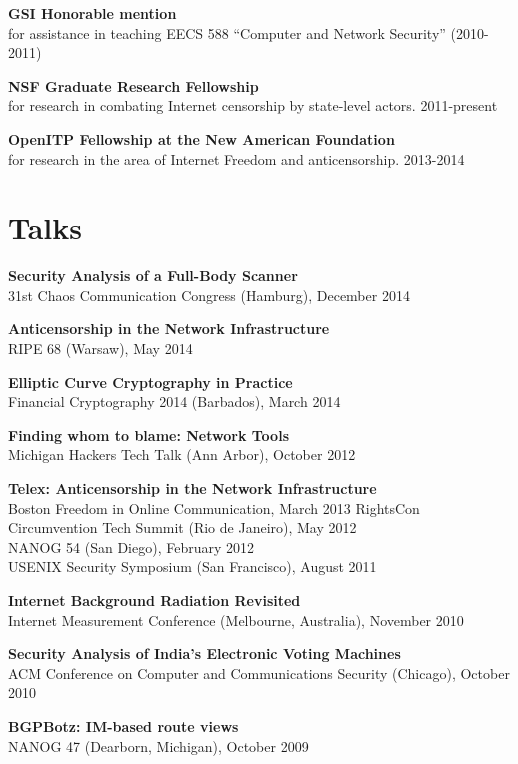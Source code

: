 \documentclass{res}
\begin{document}
\begin{resume}
    \textbf{GSI Honorable mention} \\
    for assistance in teaching EECS 588 ``Computer and Network Security'' (2010-2011)

    \textbf{NSF Graduate Research Fellowship} \\
    for research in combating Internet censorship by state-level actors. 2011-present

    \textbf{OpenITP Fellowship at the New American Foundation} \\
    for research in the area of Internet Freedom and anticensorship. 2013-2014

\section{Talks}

    \textbf{Security Analysis of a Full-Body Scanner} \\
    31st Chaos Communication Congress (Hamburg), December 2014

    \textbf{Anticensorship in the Network Infrastructure} \\
    RIPE 68 (Warsaw), May 2014

    \textbf{Elliptic Curve Cryptography in Practice} \\
    Financial Cryptography 2014 (Barbados), March 2014

    \textbf{Finding whom to blame: Network Tools} \\
    Michigan Hackers Tech Talk (Ann Arbor), October 2012

    \textbf{Telex: Anticensorship in the Network Infrastructure} \\
    Boston Freedom in Online Communication, March 2013
    RightsCon Circumvention Tech Summit (Rio de Janeiro), May 2012 \\
    NANOG 54 (San Diego), February 2012 \\
    USENIX Security Symposium (San Francisco), August 2011

    \textbf{Internet Background Radiation Revisited} \\
    Internet Measurement Conference (Melbourne, Australia), November 2010

    \textbf{Security Analysis of India's Electronic Voting Machines} \\
    ACM Conference on Computer and Communications Security (Chicago), October 2010

    \textbf{BGPBotz: IM-based route views} \\
    NANOG 47 (Dearborn, Michigan), October 2009


\end{resume}
\end{document}
